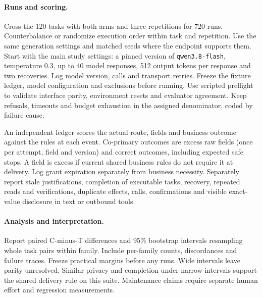 \paragraph{Runs and scoring.}
Cross the 120 tasks with both arms and three repetitions for 720 runs. Counterbalance or randomize execution order within task and repetition. Use the same generation settings and matched seeds where the endpoint supports them. Start with the main study settings: a pinned version of \texttt{qwen3.8-flash}, temperature 0.3, up to 40 model responses, 512 output tokens per response and two recoveries. Log model version, calls and transport retries. Freeze the fixture ledger, model configuration and exclusions before running. Use scripted preflight to validate interface parity, environment resets and evaluator agreement. Keep refusals, timeouts and budget exhaustion in the assigned denominator, coded by failure cause.

An independent ledger scores the actual route, fields and business outcome against the rules at each event. Co-primary outcomes are excess raw fields (once per attempt, field and version) and correct outcomes, including expected safe stops. A field is excess if current shared business rules do not require it at delivery. Log grant expiration separately from business necessity. Separately report stale justifications, completion of executable tasks, recovery, repeated reads and verifications, duplicate effects, calls, confirmations and visible exact-value disclosure in text or outbound tools.

\paragraph{Analysis and interpretation.}
Report paired C-minus-T differences and 95\% bootstrap intervals resampling whole task pairs within family. Include per-family counts, discordances and failure traces. Freeze practical margins before any runs. Wide intervals leave parity unresolved. Similar privacy and completion under narrow intervals support the shared delivery rule on this suite. Maintenance claims require separate human effort and regression measurements.
